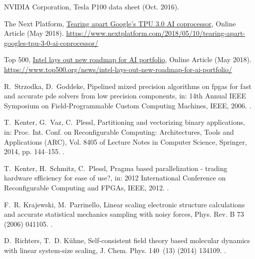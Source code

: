 \documentclass[preprint]{elsarticle}
\begin{document}
\begin{thebibliography}{10}
{NVIDIA Corporation}, Tesla {P100} data sheet (Oct. 2016).

{The Next Platform},
  \href{https://www.nextplatform.com/2018/05/10/tearing-apart-googles-tpu-3-0-ai-coprocessor/}{Tearing
  apart {Google's} {TPU} 3.0 {AI} coprocessor}, Online Article (May 2018).
\newline\urlprefix\url{https://www.nextplatform.com/2018/05/10/tearing-apart-googles-tpu-3-0-ai-coprocessor/}

{Top 500},
  \href{https://www.top500.org/news/intel-lays-out-new-roadmap-for-ai-portfolio/}{Intel
  lays out new roadmap for {AI} portfolio}, Online Article (May 2018).
\newline\urlprefix\url{https://www.top500.org/news/intel-lays-out-new-roadmap-for-ai-portfolio/}

R.~Strzodka, D.~Goddeke, Pipelined mixed precision algorithms on fpgas for fast
  and accurate pde solvers from low precision components, in: 14th Annual IEEE
  Symposium on Field-Programmable Custom Computing Machines, IEEE, 2006.
\newblock \href {https://doi.org/10.1109/FCCM.2006.57}
  {}.

T.~Kenter, G.~Vaz, C.~Plessl, Partitioning and vectorizing binary applications,
  in: Proc. Int. Conf. on Reconfigurable Computing: Architectures, Tools and
  Applications (ARC), Vol. 8405 of Lecture Notes in Computer Science, Springer,
  2014, pp. 144--155.
\newblock \href {https://doi.org/10.1007/978-3-319-05960-0\_13}
  {}.

T.~Kenter, H.~Schmitz, C.~Plessl, Pragma based parallelization - trading
  hardware efficiency for ease of use?, in: 2012 International Conference on
  Reconfigurable Computing and FPGAs, IEEE, 2012.
\newblock \href {https://doi.org/10.1109/ReConFig.2012.6416773}
  {}.

F.~R. Krajewski, M.~Parrinello, Linear scaling electronic structure
  calculations and accurate statistical mechanics sampling with noisy forces,
  Phys. Rev. B 73 (2006) 041105.
\newblock \href {https://doi.org/10.1103/PhysRevB.73.041105}
  {}.

D.~Richters, T.~D. K\"uhne, Self-consistent field theory based molecular
  dynamics with linear system-size scaling, J. Chem. Phys. 140~(13) (2014)
  134109.
\newblock \href {https://doi.org/10.1063/1.4869865}
  {}.


\end{thebibliography}
\end{document}

